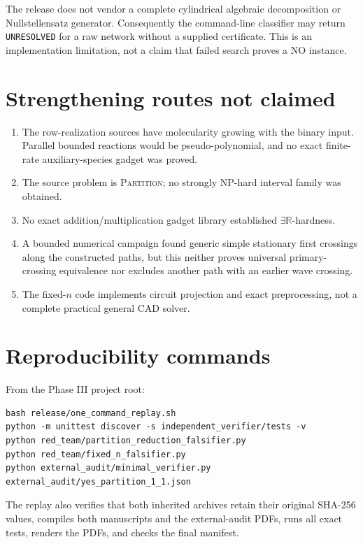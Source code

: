 \documentclass[11pt]{article}
\theoremstyle{definition}
\newcommand{\R}{\mathbb R}
\begin{document}
The release does not vendor a complete cylindrical algebraic decomposition or
Nullstellensatz generator.  Consequently the command-line classifier may
return \texttt{UNRESOLVED} for a raw network without a supplied certificate.
This is an implementation limitation, not a claim that failed search proves a
NO instance.

\section{Strengthening routes not claimed}

\begin{enumerate}
\item The row-realization sources have molecularity growing with the binary
input.  Parallel bounded reactions would be pseudo-polynomial, and no exact
finite-rate auxiliary-species gadget was proved.
\item The source problem is \textsc{Partition}; no strongly NP-hard interval
family was obtained.
\item No exact addition/multiplication gadget library established
$\exists\R$-hardness.
\item A bounded numerical campaign found generic simple stationary first
crossings along the constructed paths, but this neither proves universal
primary-crossing equivalence nor excludes another path with an earlier wave
crossing.
\item The fixed-$n$ code implements circuit projection and exact
preprocessing, not a complete practical general CAD solver.
\end{enumerate}

\section{Reproducibility commands}

From the Phase III project root:
\begin{verbatim}
bash release/one_command_replay.sh
python -m unittest discover -s independent_verifier/tests -v
python red_team/partition_reduction_falsifier.py
python red_team/fixed_n_falsifier.py
python external_audit/minimal_verifier.py external_audit/yes_partition_1_1.json
\end{verbatim}

The replay also verifies that both inherited archives retain their original
SHA-256 values, compiles both manuscripts and the external-audit PDFs, runs
all exact tests, renders the PDFs, and checks the final manifest.
\end{document}
